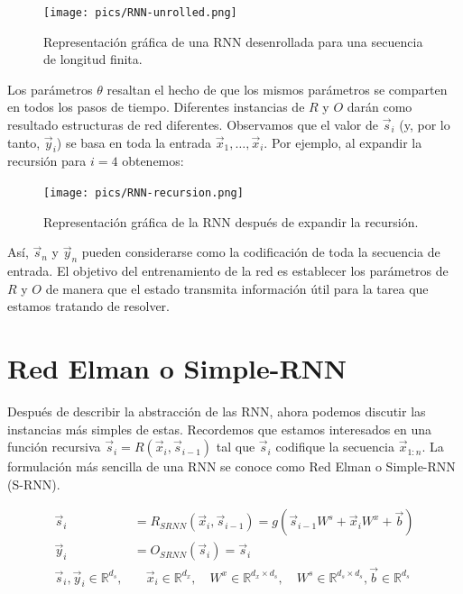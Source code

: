 \begin{figure}[h]
  \centering
  \texttt{[image: pics/RNN-unrolled.png]}
  \caption{Representación gráfica de una RNN desenrollada para una secuencia de longitud finita.}
\end{figure}

Los parámetros $\theta$ resaltan el hecho de que los mismos parámetros se comparten en todos los pasos de tiempo. Diferentes instancias de $R$ y $O$ darán como resultado estructuras de red diferentes. Observamos que el valor de $\vec{s}_i$ (y, por lo tanto, $\vec{y}_i$) se basa en toda la entrada $\vec{x}_1,\dots, \vec{x}_i$. Por ejemplo, al expandir la recursión para $i = 4$ obtenemos:

\begin{figure}[h]
  \centering
  \texttt{[image: pics/RNN-recursion.png]}
  \caption{Representación gráfica de la RNN después de expandir la recursión.}
\end{figure}

Así, $\vec{s}_n$ y $\vec{y}_n$ pueden considerarse como la codificación de toda la secuencia de entrada. El objetivo del entrenamiento de la red es establecer los parámetros de $R$ y $O$ de manera que el estado transmita información útil para la tarea que estamos tratando de resolver.

\section{Red Elman o Simple-RNN}

Después de describir la abstracción de las RNN, ahora podemos discutir las instancias más simples de estas. Recordemos que estamos interesados en una función recursiva $\vec{s}_i = R(\vec{x}_i, \vec{s}_{i-1})$ tal que $\vec{s}_i$ codifique la secuencia $\vec{x}_{1:n}$. La formulación más sencilla de una RNN se conoce como Red Elman o Simple-RNN (S-RNN).

\begin{equation}
\begin{split}
\vec{s}_i & = R_{SRNN}(\vec{x}_{i},\vec{s}_{i-1}) = g(\vec{s}_{i-1}W^{s}+\vec{x}_{i}W^{x}+\vec{b}) \\
\vec{y}_i & = O_{SRNN}(\vec{s}_i) = \vec{s}_i \\
\vec{s}_i, \vec{y}_i \in \mathbb{R}^{d_{s}}, & \quad \vec{x}_i \in \mathbb{R}^{d_{x}}, \quad W^{x} \in \mathbb{R}^{d_{x}\times d_{s}}, \quad W^{s} \in \mathbb{R}^{d_{s}\times d_{s}}, \vec{b} \in \mathbb{R}^{d_{s}}
\end{split}
\end{equation}


